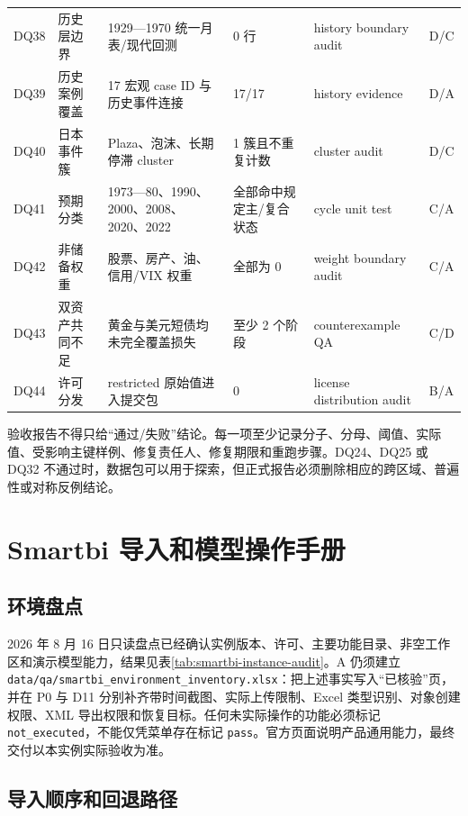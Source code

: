 \documentclass[UTF8,fontset=windows,12pt,openany]{ctexbook}
\newcommand{\Field}[1]{{\small\nolinkurl{#1}}}
\newcommand{\File}[1]{{\small\begingroup\urlstyle{same}\nolinkurl{#1}\endgroup}}
\begin{document}
\begin{landscape}
\begin{longtable}{p{1.7cm}p{4.0cm}p{4.6cm}p{3.0cm}p{3.2cm}p{2.7cm}}
DQ38 & 历史层边界 & 1929—1970 统一月表/现代回测 & 0 行 & history boundary audit & D/C\\
DQ39 & 历史案例覆盖 & 17 宏观 case ID 与历史事件连接 & 17/17 & history evidence & D/A\\
DQ40 & 日本事件簇 & Plaza、泡沫、长期停滞 cluster & 1 簇且不重复计数 & cluster audit & D/C\\
DQ41 & 预期分类 & 1973—80、1990、2000、2008、2020、2022 & 全部命中规定主/复合状态 & cycle unit test & C/A\\
DQ42 & 非储备权重 & 股票、房产、油、信用/VIX 权重 & 全部为 0 & weight boundary audit & C/A\\
DQ43 & 双资产共同不足 & 黄金与美元短债均未完全覆盖损失 & 至少 2 个阶段 & counterexample QA & C/D\\
DQ44 & 许可分发 & restricted 原始值进入提交包 & 0 & license distribution audit & B/A\\
\bottomrule
\end{longtable}
\end{landscape}

验收报告不得只给“通过/失败”结论。每一项至少记录分子、分母、阈值、实际值、受影响主键样例、修复责任人、修复期限和重跑步骤。DQ24、DQ25 或 DQ32 不通过时，数据包可以用于探索，但正式报告必须删除相应的跨区域、普遍性或对称反例结论。

\chapter{Smartbi 导入和模型操作手册}

\section{环境盘点}

2026 年 8 月 16 日只读盘点已经确认实例版本、许可、主要功能目录、非空工作区和演示模型能力，结果见表\ref{tab:smartbi-instance-audit}。A 仍须建立 \File{data/qa/smartbi_environment_inventory.xlsx}：把上述事实写入“已核验”页，并在 P0 与 D11 分别补齐带时间截图、实际上传限制、Excel 类型识别、对象创建权限、XML 导出权限和恢复目标。任何未实际操作的功能必须标记 \Field{not_executed}，不能仅凭菜单存在标记 \Field{pass}。官方页面说明产品通用能力\cite{smartbiversion,smartbiprepare,smartbiaichat}，最终交付以本实例实际验收为准。

\section{导入顺序和回退路径}
\end{document}

